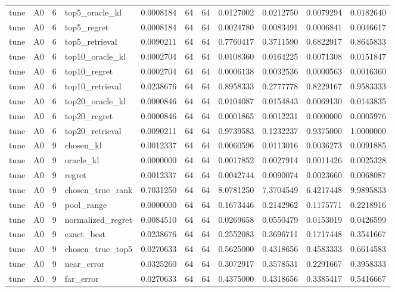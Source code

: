 \begin{tabular}{llrlrrrrrrr}
tune & A0 & 6 & top5_oracle_kl & 0.0008184 & 64 & 64 & 0.0127002 & 0.0212750 & 0.0079294 & 0.0182640 \\
tune & A0 & 6 & top5_regret & 0.0008184 & 64 & 64 & 0.0024780 & 0.0083491 & 0.0006841 & 0.0046617 \\
tune & A0 & 6 & top5_retrieval & 0.0090211 & 64 & 64 & 0.7760417 & 0.3711590 & 0.6822917 & 0.8645833 \\
tune & A0 & 6 & top10_oracle_kl & 0.0002704 & 64 & 64 & 0.0108360 & 0.0164225 & 0.0071308 & 0.0151847 \\
tune & A0 & 6 & top10_regret & 0.0002704 & 64 & 64 & 0.0006138 & 0.0032536 & 0.0000563 & 0.0016360 \\
tune & A0 & 6 & top10_retrieval & 0.0238676 & 64 & 64 & 0.8958333 & 0.2777778 & 0.8229167 & 0.9583333 \\
tune & A0 & 6 & top20_oracle_kl & 0.0000846 & 64 & 64 & 0.0104087 & 0.0154843 & 0.0069130 & 0.0143835 \\
tune & A0 & 6 & top20_regret & 0.0000846 & 64 & 64 & 0.0001865 & 0.0012231 & 0.0000000 & 0.0005976 \\
tune & A0 & 6 & top20_retrieval & 0.0090211 & 64 & 64 & 0.9739583 & 0.1232237 & 0.9375000 & 1.0000000 \\
tune & A0 & 9 & chosen_kl & 0.0012337 & 64 & 64 & 0.0060596 & 0.0113016 & 0.0036273 & 0.0091885 \\
tune & A0 & 9 & oracle_kl & 0.0000000 & 64 & 64 & 0.0017852 & 0.0027914 & 0.0011426 & 0.0025328 \\
tune & A0 & 9 & regret & 0.0012337 & 64 & 64 & 0.0042744 & 0.0090074 & 0.0023660 & 0.0068087 \\
tune & A0 & 9 & chosen_true_rank & 0.7031250 & 64 & 64 & 8.0781250 & 7.3704549 & 6.4217448 & 9.9895833 \\
tune & A0 & 9 & pool_range & 0.0000000 & 64 & 64 & 0.1673446 & 0.2142962 & 0.1175771 & 0.2218916 \\
tune & A0 & 9 & normalized_regret & 0.0084510 & 64 & 64 & 0.0269658 & 0.0550479 & 0.0153019 & 0.0426599 \\
tune & A0 & 9 & exact_best & 0.0238676 & 64 & 64 & 0.2552083 & 0.3696711 & 0.1717448 & 0.3541667 \\
tune & A0 & 9 & chosen_true_top5 & 0.0270633 & 64 & 64 & 0.5625000 & 0.4318656 & 0.4583333 & 0.6614583 \\
tune & A0 & 9 & near_error & 0.0325260 & 64 & 64 & 0.3072917 & 0.3578531 & 0.2291667 & 0.3958333 \\
tune & A0 & 9 & far_error & 0.0270633 & 64 & 64 & 0.4375000 & 0.4318656 & 0.3385417 & 0.5416667 \\

\end{tabular}
